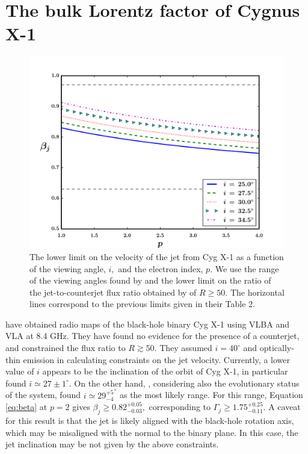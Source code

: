 \section{The bulk Lorentz factor of Cygnus X-1} \label{sec:CygX-1}


\begin{figure}
\centerline{\includegraphics[scale=0.6]{beta_vs_p_CygX-1_Ziokowski.pdf}}
\caption{The lower limit on the velocity of the jet from Cyg X-1 as a function of the viewing angle, $ i , $ and the electron index, $ p . $ We use the range of the viewing angles found by \citealt{Ziolkowski-2014-MNRAS} and the lower limit on the ratio of the jet-to-counterjet flux ratio obtained by \citealt{Stirling_et_al.-2001-MNRAS} of $ R \geq 50 . $ The horizontal lines correspond to the previous limits given in their Table 2.
}
\label{eq:beta_p}
\end{figure}


\citealt{Stirling_et_al.-2001-MNRAS} have obtained radio maps of the black-hole binary Cyg X-1 using VLBA and VLA at 8.4 GHz. They have found no evidence for the presence of a counterjet, and constrained the flux ratio to $ R \gtrsim 50 $. They assumed $ i = 40^{\circ} $ and optically-thin emission in calculating constraints on the jet velocity. Currently, a lower value of $ i $ appears to be the inclination of the orbit of Cyg X-1, in particular \citealt{Orosz_et_al.-2011-ApJ} found $ i \simeq 27 \pm 1 ^{\circ} . $ On the other hand, \citealt{Ziolkowski-2014-MNRAS}, considering also the evolutionary status of the system, found $ i \simeq {29^{+5}_{-4}}^{\circ} $ as the most likely range. For this range, Equation \ref{eq:beta} at $ p = 2 $ gives $ \beta_j \geq 0.82_{-0.03}^{+0.05} , $ corresponding to $ \Gamma_j \geq 1.75_{-0.11}^{+0.25} . $ A caveat for this result is that the jet is likely aligned with the black-hole rotation axis, which may be misaligned with the normal to the binary plane. In this case, the jet inclination may be not given by the above constraints.

